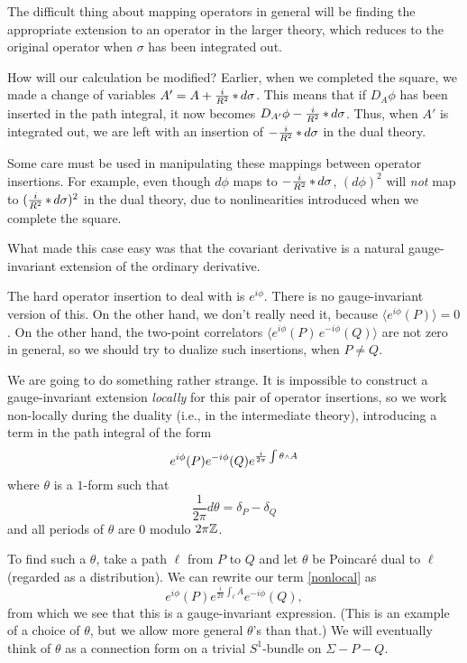 The difficult thing about mapping operators in general will be finding the
appropriate extension to an operator in the larger theory, which reduces to
the original operator when $\sigma$ has been integrated out.

How will our calculation be modified?  Earlier, when we completed the square,
we made a change of variables $A'=A+\frac{i}{R^2}\mathop{*} d\sigma$.  This
means that if $D_A\phi$
has been inserted in the path integral, it now becomes $D_{A'}\phi
-\frac{i}{R^2}\mathop{*} d\sigma$.
Thus, when $A'$ is integrated out, we are left with an insertion of
$-\frac{i}{R^2}\mathop{*} d\sigma$
in the dual theory.

Some care must be used in manipulating these mappings between operator
insertions.  For example, even though $d\phi$ maps to  $-\frac{i}{R^2}\mathop{*}
d\sigma$,
$(d\phi)^2$ will {\it not}\/ map to $(\frac{i}{R^2}\mathop{*} d\sigma)^2$ in the
dual theory, due to
nonlinearities introduced when we complete the square.

What made this case easy was that the covariant derivative is a natural
gauge-invariant extension of the ordinary derivative.

The hard operator insertion to deal with is $e^{i\phi}$.  There is no
gauge-invariant
version of this.  On the other hand, we don't really need it, because
$\langle e^{i\phi}(P)\rangle=0$.  On the other hand, the two-point correlators
$\langle e^{i\phi}(P)\, e^{-i\phi}(Q)\rangle$ are not zero in general, so
we should try to dualize such insertions, when $P\ne Q$.

We are going to do something rather strange.
It is impossible to construct a gauge-invariant extension {\it locally}\/ for
this pair of operator insertions, so we work non-locally during the duality
(i.e., in the intermediate theory), introducing a term in the path integral
of the form
\begin{equation}\label{nonlocal}
e^{i\phi}(P) e^{-i\phi}(Q) e^{\frac{i}{2\pi}\int \theta\wdg A}
\end{equation}
where $\theta$ is a $1$-form such that
\begin{equation}
\frac1{2\pi}d\theta=\delta_P-\delta_Q
\end{equation}
and all periods of $\theta $ are $0$ modulo $2\pi {\Bbb Z}$.

To find such a $\theta$, take a path $\ell$ from $P$ to $Q$ and let $\theta$ be
Poincar\'e dual to $\ell$ (regarded as a
distribution).  We can rewrite our term \eqref{nonlocal} as
\begin{equation}
e^{i\phi}(P) e^{\frac{i}{2\pi}\int_\ell  A} e^{-i\phi}(Q) ,
\end{equation}
from which we see that this is a gauge-invariant expression.  (This is an
example of a choice of $\theta$, but we allow
more general $\theta$'s than that.)  We will eventually think of $\theta $
as a connection form on a trivial $S^1$-bundle on $\Sigma- P- Q$.

